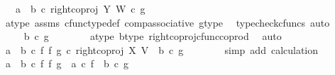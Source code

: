 \begin{isabellebody}
\ {\isachardoublequoteopen}{\isachardot}{\kern0pt}{\isachardot}{\kern0pt}{\isachardot}{\kern0pt}\ {\isacharequal}{\kern0pt}\ {\isacharparenleft}{\kern0pt}{\isacharparenleft}{\kern0pt}a\ {\isasymamalg}\ b{\isacharparenright}{\kern0pt}\ {\isasymcirc}\isactrlsub c\ right{\isacharunderscore}{\kern0pt}coproj\ Y\ W{\isacharparenright}{\kern0pt}\ {\isasymcirc}\isactrlsub c\ g{\isachardoublequoteclose}\isanewline
\ \ \ \ \ \ \isamarkupfalse%
\ a{\isacharunderscore}{\kern0pt}type\ assms{\isacharparenleft}{\kern0pt}{}{\isacharparenright}{\kern0pt}\ cfunc{\isacharunderscore}{\kern0pt}type{\isacharunderscore}{\kern0pt}def\ comp{\isacharunderscore}{\kern0pt}associative\ g{\isacharunderscore}{\kern0pt}type\ \isamarkupfalse%
\ {\isacharparenleft}{\kern0pt}typecheck{\isacharunderscore}{\kern0pt}cfuncs{\isacharcomma}{\kern0pt}\ auto{\isacharparenright}{\kern0pt}\isanewline
\ \ \ \ \isamarkupfalse%
\ \isamarkupfalse%
\ {\isachardoublequoteopen}{\isachardot}{\kern0pt}{\isachardot}{\kern0pt}{\isachardot}{\kern0pt}\ {\isacharequal}{\kern0pt}\ {\isacharparenleft}{\kern0pt}b\ {\isasymcirc}\isactrlsub c\ g{\isacharparenright}{\kern0pt}{\isachardoublequoteclose}\isanewline
\ \ \ \ \ \ \isamarkupfalse%
\ a{\isacharunderscore}{\kern0pt}type\ b{\isacharunderscore}{\kern0pt}type\ right{\isacharunderscore}{\kern0pt}coproj{\isacharunderscore}{\kern0pt}cfunc{\isacharunderscore}{\kern0pt}coprod\ \isamarkupfalse%
\ auto\isanewline
\ \ \ \ \isamarkupfalse%
\ \isamarkupfalse%
\ {\isachardoublequoteopen}{\isacharparenleft}{\kern0pt}a\ {\isasymamalg}\ b\ {\isasymcirc}\isactrlsub c\ f\ {\isasymbowtie}\isactrlsub f\ g{\isacharparenright}{\kern0pt}\ {\isasymcirc}\isactrlsub c\ right{\isacharunderscore}{\kern0pt}coproj\ X\ V\ {\isacharequal}{\kern0pt}\ {\isacharparenleft}{\kern0pt}b\ {\isasymcirc}\isactrlsub c\ g{\isacharparenright}{\kern0pt}{\isachardoublequoteclose}\isanewline
\ \ \ \ \ \ \isamarkupfalse%
\ {\isacharparenleft}{\kern0pt}simp\ add{\isacharcolon}{\kern0pt}\ calculation{\isacharparenright}{\kern0pt}\isanewline
\ \ \isamarkupfalse%
\isanewline
\isanewline
\ \ \isamarkupfalse%
\ {\isachardoublequoteopen}{\isacharparenleft}{\kern0pt}a\ {\isasymamalg}\ b{\isacharparenright}{\kern0pt}\ {\isasymcirc}\isactrlsub c\ {\isacharparenleft}{\kern0pt}f\ {\isasymbowtie}\isactrlsub f\ g{\isacharparenright}{\kern0pt}\ {\isacharequal}{\kern0pt}\ {\isacharparenleft}{\kern0pt}a\ {\isasymcirc}\isactrlsub c\ f{\isacharparenright}{\kern0pt}\ {\isasymamalg}\ {\isacharparenleft}{\kern0pt}b\ {\isasymcirc}\isactrlsub c\ g{\isacharparenright}{\kern0pt}{\isachardoublequoteclose}\isanewline

\end{isabellebody}
